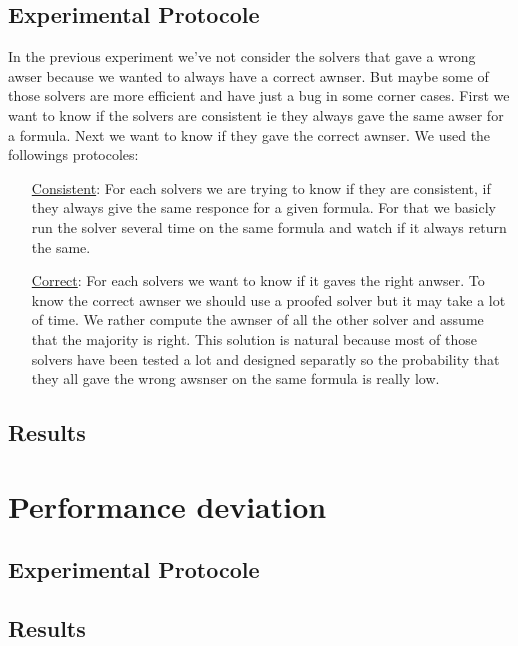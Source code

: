 \documentclass{article}
\begin{document}
\subsection{Experimental Protocole}
In the previous experiment we've not consider the solvers that gave a wrong awser because we wanted to always have a correct awnser. But maybe some of those solvers are more efficient and have just a bug in some corner cases. First we want to know if the solvers are consistent ie they always gave the same awser for a formula. Next we want to know if they gave the correct awnser.  
We used the followings protocoles:
\begin{itemize}
\item[\underline{Consistent}:]  For each solvers we are trying to know if they are consistent, if they always give the same responce for a given formula. For that we basicly run the solver several time on the same formula and watch if it always return the same. 
\item[\underline{Correct}:] For each solvers we want to know if it gaves the right anwser. To know the correct awnser we should use a proofed solver but it may take a lot of time. We rather compute the awnser of all the other solver and assume that the majority is right. This solution is natural because most of those solvers have been tested a lot and designed separatly so the probability that they all gave the wrong awsnser on the same formula is really low. 
\end{itemize}
\subsection{Results}




\section{Performance deviation}
\subsection{Experimental Protocole}


\subsection{Results}

\end{document}
